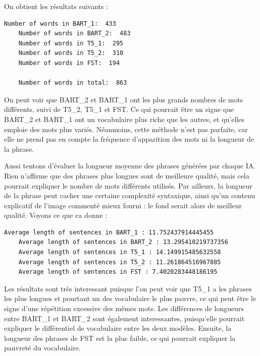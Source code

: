 \documentclass[11pt]{article}
\begin{document}
On obtient les résultats suivants : 

\vspace{5mm}

\begin{mdframed}
  \begin{lstlisting}[style=terminal]
    Number of words in BART_1:  433
    Number of words in BART_2:  483
    Number of words in T5_1:  295
    Number of words in T5_2:  310
    Number of words in FST:  194

    Number of words in total:  863  
  \end{lstlisting}
\end{mdframed}

\vspace{5mm}

On peut voir que BART\_2 et BART\_1 ont les plus grands nombres de mots différents, suivi de T5\_2, T5\_1 et FST. Ce qui pourrait être un signe que 
BART\_2 et BART\_1 ont un vocabulaire plus riche que les autres, et qu'elles emploie des mots plus variés. 
Néanmoins, cette méthode n'est pas parfaite, car elle ne prend pas en compte la fréquence d'apparition des mots ni la longueur de la phrase.

Aussi tentons d'évaluer la longueur moyenne des phrases générées par chaque IA. Rien n'affirme que des phrases plus longues sont de meilleure qualité, mais cela pourrait expliquer le nombre de mots différents utilisés. Par ailleurs, 
la longueur de la phrase peut cacher une certaine complexité syntaxique, ainsi qu'un contenu explicatif de l'image commenté mieux fourni : le fond serait alors de meilleur qualité. Voyons ce que ca donne : 

\vspace{5mm}

\begin{mdframed}
  \begin{lstlisting}[style=terminal]
    Average length of sentences in BART_1 : 11.752437914445455
    Average length of sentences in BART_2 : 13.295410219737356
    Average length of sentences in T5_1 : 14.149915485632558
    Average length of sentences in T5_2 : 11.261864516967885
    Average length of sentences in FST : 7.4020283448186195
  \end{lstlisting}
\end{mdframed}

\vspace{5mm}

Les résultats sont très interessant puisque l'on peut voir que T5\_1 a les phrases les plus longues et pourtant un des vocabulaire le plus pauvre, ce qui peut être le signe d'une répétition excessive des mêmes mots. 
Les différences de longueurs entre BART\_1 et BART\_2 sont également interessantes, puisqu'elle pourrait expliquer le différentiel de vocabulaire entre les deux modèles.
Ensuite, la longueur des phrases de FST est la plus faible, ce qui pourrait expliquer la pauvreté du vocabulaire.
\end{document}
